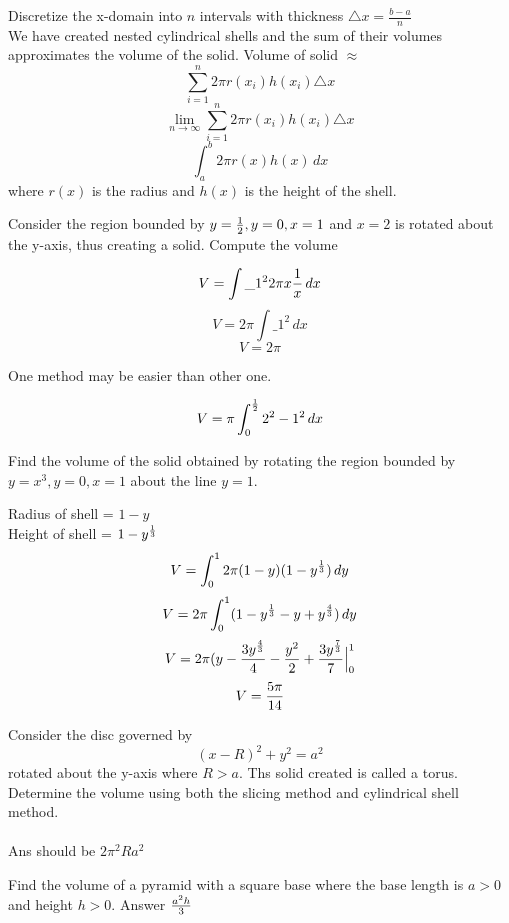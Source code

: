 \documentclass[english, 12pt]{article}
\begin{document}
Discretize the x-domain into $n$ intervals with thickness $\triangle x = \frac{b-a}{n}$ \\
We have created nested cylindrical shells and the sum of their volumes approximates the volume of the solid.
Volume of solid $\approx$
\[ \sum_{i=1}^{n} 2\pi r(x_{i}) h(x_{i}) \triangle x\]
\[ \lim_{ n \to \infty}  \sum_{i=1}^{n} 2\pi r(x_{i}) h(x_{i}) \triangle x \]
\[ \int_a^b 2 \pi r(x) h(x)\,dx \]
where $r(x)$ is the radius and $h(x)$ is the height of the shell.
\begin{exmp}
Consider the region bounded by $y = \frac{1}{2} , y = 0, x = 1$ and $x=2$ is rotated about the y-axis, thus creating a solid. Compute the volume 
\begin{sol}
\[ V = \int\_1^2 2 \pi x \frac{1}{x} \, dx \]
\[ V = 2 \pi \int\_1^2 \, dx \]
\[ V = 2 \pi \]
\begin{note}
One method may be easier than other one.
\end{note}
\end{sol}
\begin{sol}
\[ V = \pi \int_0^{\frac{1}{2}} 2^2 - 1^2\, dx \]
\end{sol}
\end{exmp}
\begin{exmp}
Find the volume of the solid obtained by rotating the region bounded by $y=x^3, y=0,x=1$ about the line $y=1$.
\begin{sol}
Radius of shell = $1 - y$\\
Height of shell = $1-y^{\frac{1}{3}}$\\
\[V = \int_0^1 2 \pi (1-y) (1-y^{\frac{1}{3}})\, dy\]
\[ V = 2 \pi \int_0^1 (1-y^{\frac{1}{3}} - y + y^{\frac{4}{3}})\,dy \]
\[ V = 2 \pi (y  - \frac{3y^{\frac{4}{3}}}{4} - \frac{y^2}{2} + \frac{3y^{\frac{7}{3}}}{7}\Big|_0^1 \]
\[ V = \frac{5 \pi}{14} \]
\end{sol}
\end{exmp}
\begin{exercise}
Consider the disc governed by 
\[ (x-R)^2 + y^2 = a^2 \] rotated about the y-axis where $R > a$. Ths solid created is called a torus. Determine the volume using both the slicing method and cylindrical shell method.\\\\
Ans should be $2 \pi^2 R a^2$
\end{exercise}
\begin{exercise}
Find the volume of a pyramid with a square base where the base length is $a>0$ and height $h>0$. Answer $\frac{a^2h}{3}$
\end{exercise}
\end{document}
